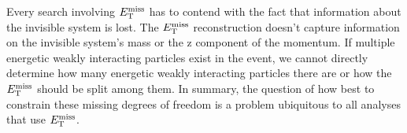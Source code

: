 


\indent Every search involving $E_{\mathrm{T}}^{\mathrm{miss}}$ has to contend with the fact that information about the invisible system is lost.  The $E_{\mathrm{T}}^{\mathrm{miss}}$ reconstruction doesn't capture information on the invisible system's mass or the z component of the momentum.  If multiple energetic weakly interacting particles exist in the event, we cannot directly determine how many energetic weakly interacting particles there are or how the $E_{\mathrm{T}}^{\mathrm{miss}}$ should be split among them.  In summary, the question of how best to constrain these missing degrees of freedom is a problem ubiquitous to all analyses that use $E_{\mathrm{T}}^{\mathrm{miss}}$. \\


